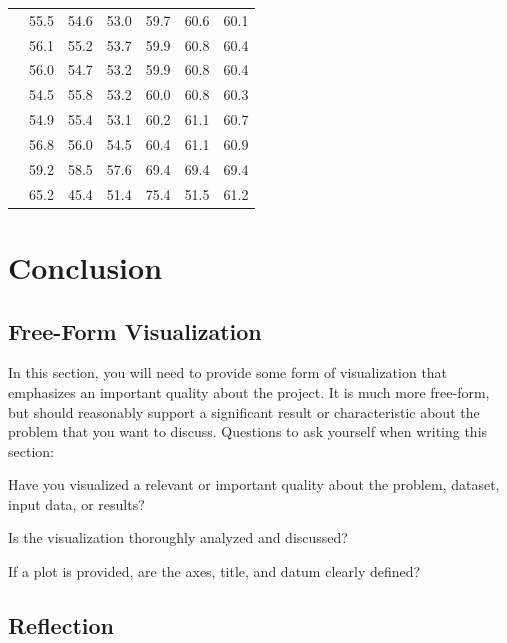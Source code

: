 \documentclass[12pt,journal,compsoc]{IEEEtran}
\begin{document}
\begin{table}
\begin{tabular}{lllllll}
\hline
             & 55.5 & 54.6 & 53.0 & 59.7 & 60.6 & 60.1 \\ %
             & 56.1 & 55.2 & 53.7 & 59.9 & 60.8 & 60.4 \\ %
             & 56.0 & 54.7 & 53.2 & 59.9 & 60.8 & 60.4 \\ %
             & 54.5 & 55.8 & 53.2 & 60.0 & 60.8 & 60.3 \\ %
             & 54.9 & 55.4 & 53.1 & 60.2 & 61.1 & 60.7 \\ %
             & 56.8 & 56.0 & 54.5 & 60.4 & 61.1 & 60.9 \\ %
             & 59.2 & 58.5 & 57.6 & 69.4 & 69.4 & 69.4 \\ %
             & 65.2 & 45.4 & 51.4 & 75.4 & 51.5 & 61.2 \\ %
\hline
\end{tabular}
\end{table}


\section{Conclusion} %
\subsection{Free-Form Visualization}
In this section, you will need to provide some form of visualization that emphasizes an important quality about the project. It is much more free-form, but should reasonably support a significant result or characteristic about the problem that you want to discuss. Questions to ask yourself when writing this section:

Have you visualized a relevant or important quality about the problem, dataset, input data, or results?

Is the visualization thoroughly analyzed and discussed?

If a plot is provided, are the axes, title, and datum clearly defined?


\subsection{Reflection}
\end{document}
